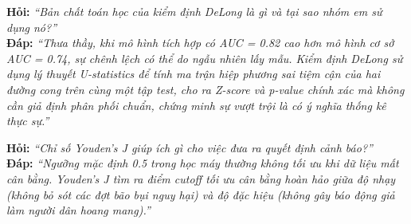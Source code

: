 \documentclass[11pt,a4paper]{article}
\begin{document}
\begin{tcolorbox}[colback=blue!5!white, colframe=blue!60!black, fonttitle=\bfseries\color{white}, title={BỘ CÂU HỎI VẤN ĐÁP TRỌNG TÂM DÀNH CHO TV 8}]
\textbf{Hỏi:} \textit{“Bản chất toán học của kiểm định DeLong là gì và tại sao nhóm em sử dụng nó?”}\\
\textbf{Đáp:} \textit{“Thưa thầy, khi mô hình tích hợp có AUC = 0.82 cao hơn mô hình cơ sở AUC = 0.74, sự chênh lệch có thể do ngẫu nhiên lấy mẫu. Kiểm định DeLong sử dụng lý thuyết U-statistics để tính ma trận hiệp phương sai tiệm cận của hai đường cong trên cùng một tập test, cho ra Z-score và p-value chính xác mà không cần giả định phân phối chuẩn, chứng minh sự vượt trội là có ý nghĩa thống kê thực sự.”}

\textbf{Hỏi:} \textit{“Chỉ số Youden's J giúp ích gì cho việc đưa ra quyết định cảnh báo?”}\\
\textbf{Đáp:} \textit{“Ngưỡng mặc định 0.5 trong học máy thường không tối ưu khi dữ liệu mất cân bằng. Youden's J tìm ra điểm cutoff tối ưu cân bằng hoàn hảo giữa độ nhạy (không bỏ sót các đợt bão bụi nguy hại) và độ đặc hiệu (không gây báo động giả làm người dân hoang mang).”}
\end{tcolorbox}

\end{document}
